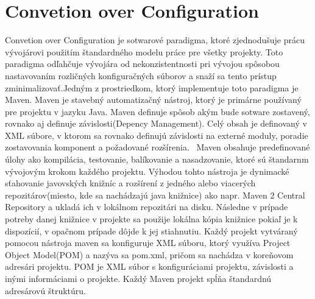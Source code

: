 \section{Convetion over Configuration}
Convetion over Configuration je sotwarové paradigma, ktoré zjednodušuje prácu vývojárovi použitím štandardného modelu práce pre všetky projekty. Toto paradigma odľahčuje vývojára od nekonzistentnosti pri vývojou spôsobou nastavovaním rozličných konfiguračných súborov a snaží sa tento prístup zminimalizovať.\newline \indent Jedným z prostriedkom, ktorý implementuje toto paradigma je Maven. Maven je stavebný automatizačný nástroj, ktorý je primárne používaný pre projektu v jazyku Java. Maven definuje spôsob akým bude sotware zostavený, rovnako aj definuje závislosti(Depency Management). Celý obsah je definovaný v XML súbore, v ktorom sa rovnako definujú závislosti na externé moduly, poradie zostavovania komponent a požadované rozšírenia. 
\newline \indent Maven obsahuje predefinované úlohy ako kompilácia, testovanie, balíkovanie a nasadzovanie, ktoré sú štandarnm vývojovým krokom každého projektu. Výhodou tohto nástroja je dynimacké sťahovanie javovských knižníc a rozšírení z jedného alebo viacerých repozitárov(miesto, kde sa nachádzajú java knižnice) ako napr. Maven 2 Central Repository a ukladá ich v lokálnom repozitári na disku. Následne v prípade potreby danej knižnice v projekte sa použije lokálna kópia knižnice pokiaľ je k dispozícií, v opačnom prípade dôjde k jej stiahnutiu. \newline \indent Každý projekt vytváraný pomocou nástroja maven sa konfiguruje XML súboru, ktorý využíva Project Object Model(POM) a nazýva sa pom.xml, pričom sa nachádza v koreňovom adresári projektu. POM je XML súbor s konfiguráciami projektu, závislosti a inými informáciami o projekte. Každý Maven projekt spĺňa štandardnú adresárovú štruktúru.

